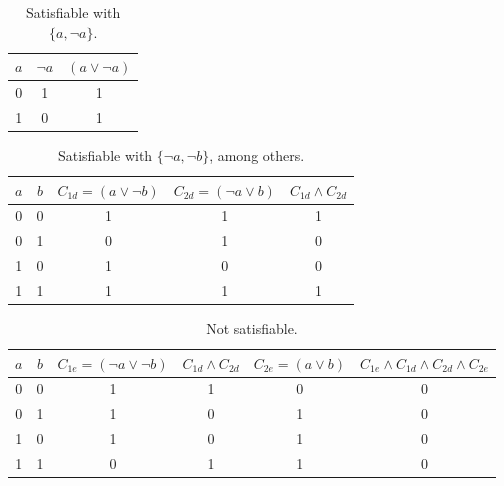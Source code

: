 \documentclass{article}
\begin{document}
\begin{enumerate}
    \begin{table}[h]
        \centering
        \begin{tabular}{c c | c}\toprule
            $a$ & $\neg a$ & $(a \lor \neg a)$ \\\midrule
            0 & 1 & 1 \\
            1 & 0 & 1 \\\bottomrule
        \end{tabular}
        \caption{Satisfiable with $\{a, \neg a\}$.}
    \end{table}
    
    \begin{table}[h]
        \centering
        \begin{tabular}{c c | c c | c}\toprule
            $a$ & $b$ & $C_{1d} = (a \lor \neg b)$ & $C_{2d} = (\neg a \lor b)$ & $C_{1d} \land C_{2d}$ \\\midrule
            0 & 0 & 1 & 1 & 1 \\
            0 & 1 & 0 & 1 & 0 \\
            1 & 0 & 1 & 0 & 0 \\
            1 & 1 & 1 & 1 & 1 \\\bottomrule
        \end{tabular}
        \caption{Satisfiable with $\{\neg a, \neg b\}$, among others.}
    \end{table}
    
    \begin{table}[h]
        \centering
        \begin{tabular}{c c | c c c | c}\toprule
            $a$ & $b$ & $C_{1e} = (\neg a \lor \neg b)$ & $C_{1d} \land C_{2d}$ & $C_{2e} = (a \lor b)$ & $C_{1e} \land C_{1d} \land C_{2d} \land C_{2e}$ \\\midrule
            0 & 0 & 1 & 1 & 0 & 0 \\
            0 & 1 & 1 & 0 & 1 & 0 \\
            1 & 0 & 1 & 0 & 1 & 0 \\
            1 & 1 & 0 & 1 & 1 & 0 \\\bottomrule
        \end{tabular}
        \caption{Not satisfiable.}
    \end{table}
    

\end{enumerate}
\end{document}
